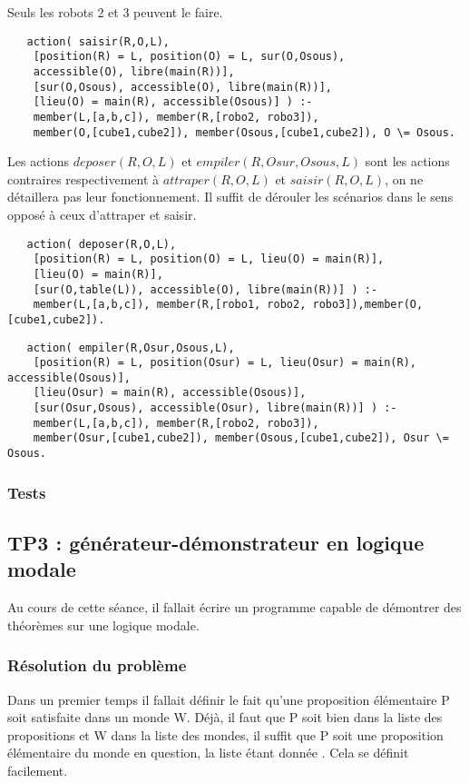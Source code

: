 \documentclass[a4paper,10pt]{article}
\begin{document}
   Seuls les robots 2 et 3 peuvent le faire.
   \begin{lstlisting}
   action( saisir(R,O,L),
	[position(R) = L, position(O) = L, sur(O,Osous), 
	accessible(O), libre(main(R))],
	[sur(O,Osous), accessible(O), libre(main(R))],
	[lieu(O) = main(R), accessible(Osous)] ) :-
	member(L,[a,b,c]), member(R,[robo2, robo3]), 
	member(O,[cube1,cube2]), member(Osous,[cube1,cube2]), O \= Osous.
   \end{lstlisting}
   Les actions $deposer(R,O,L)$ et $empiler(R,Osur,Osous,L)$ sont les actions contraires respectivement à $attraper(R,O,L)$ et $saisir(R,O,L)$, on ne détaillera
   pas leur fonctionnement. Il suffit de d\'{e}rouler les sc\'{e}narios dans le sens oppos\'{e} \`{a} ceux d'attraper et saisir.
   \begin{lstlisting}
   action( deposer(R,O,L),
	[position(R) = L, position(O) = L, lieu(O) = main(R)],
	[lieu(O) = main(R)],
	[sur(O,table(L)), accessible(O), libre(main(R))] ) :-
	member(L,[a,b,c]), member(R,[robo1, robo2, robo3]),member(O,[cube1,cube2]).
   \end{lstlisting}
   \begin{lstlisting}
   action( empiler(R,Osur,Osous,L),
	[position(R) = L, position(Osur) = L, lieu(Osur) = main(R), accessible(Osous)],
	[lieu(Osur) = main(R), accessible(Osous)],
	[sur(Osur,Osous), accessible(Osur), libre(main(R))] ) :-
	member(L,[a,b,c]), member(R,[robo2, robo3]), 
	member(Osur,[cube1,cube2]), member(Osous,[cube1,cube2]), Osur \= Osous.
   \end{lstlisting}
   \subsubsection{Tests}
   
  \subsection{TP3 : g\'{e}n\'{e}rateur-d\'{e}monstrateur en logique modale}
  Au cours de cette s\'{e}ance, il fallait \'{e}crire un programme capable de d\'{e}montrer des th\'{e}or\`{e}mes sur une logique modale.
  
   \subsubsection{R\'{e}solution du probl\`{e}me}
   Dans un premier temps il fallait d\'{e}finir le fait qu'une proposition \'{e}l\'{e}mentaire P soit satisfaite dans un monde W. D\'{e}j\`{a}, il faut que P soit bien dans 
   la liste des propositions et W dans la liste des mondes, il suffit que P soit une proposition \'{e}l\'{e}mentaire du monde en question,
   la liste \'{e}tant donn\'{e}e . Cela se d\'{e}finit facilement.
   
\end{document}
